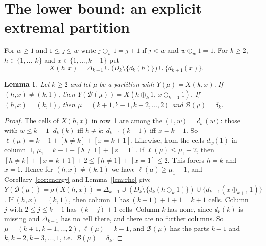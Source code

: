 \documentclass[11pt]{article}
\newtheorem{lemma}[theorem]{Lemma}
\theoremstyle{definition}
\newcommand{\B}{\mathcal{B}}
\renewcommand{\le}{\leqslant}
\renewcommand{\ge}{\geqslant}
\begin{document}
\section{The lower bound: an explicit extremal partition}\label{sec:c2lower}

For $w\ge1$ and $1\le j\le w$ write $j\oplus_w1=j+1$ if $j<w$ and $w\oplus_w1=1$.  For $k\ge2$, $h\in\{1,\dots,k\}$ and
$x\in\{1,\dots,k+1\}$ put
\[X(h,x)=\Delta_{k-1}\cup\bigl(D_k\setminus\{d_k(h)\}\bigr)\cup\{d_{k+1}(x)\}.\]

\begin{lemma}\label{lem:c2conf}
Let $k\ge2$ and let $\mu$ be a partition with $Y(\mu)=X(h,x)$.
If $(h,x)\ne(k,1)$, then $Y(\B(\mu))=X(h\oplus_k1,\,x\oplus_{k+1}1)$.
If $(h,x)=(k,1)$, then $\mu=(k+1,k-1,k-2,\dots,2)$ and $\B(\mu)=\delta_k$.
\end{lemma}
\begin{proof}
The cells of $X(h,x)$ in row~1 are among the $(1,w)=d_w(w)$: those with $w\le k-1$; $d_k(k)$ iff $h\ne k$;
$d_{k+1}(k+1)$ iff $x=k+1$.  So $\ell(\mu)=k-1+[h\ne k]+[x=k+1]$.  Likewise, from the cells $d_w(1)$ in column~1,
$\mu_1=k-1+[h\ne1]+[x=1]$.  If $\ell(\mu)\le\mu_1-2$, then $[h\ne k]+[x=k+1]+2\le[h\ne1]+[x=1]\le2$.  This forces
$h=k$ and $x=1$.  Hence for $(h,x)\ne(k,1)$ we have $\ell(\mu)\ge\mu_1-1$, and Corollary~\ref{cor:energy} and
Lemma~\ref{lem:rho} give
$Y(\B(\mu))=\rho(X(h,x))=\Delta_{k-1}\cup(D_k\setminus\{d_k(h\oplus_k1)\})\cup\{d_{k+1}(x\oplus_{k+1}1)\}$.
If $(h,x)=(k,1)$, then column~1 has $(k-1)+1+1=k+1$ cells.  Column $j$ with $2\le j\le k-1$ has $(k-j)+1$ cells.
Column $k$ has none, since $d_k(k)$ is missing and $\Delta_{k-1}$ has no cell there, and there are no further
columns.  So $\mu=(k+1,k-1,\dots,2)$, $\ell(\mu)=k-1$, and $\B(\mu)$ has the parts $k-1$ and
$k,k-2,k-3,\dots,1$, i.e.\ $\B(\mu)=\delta_k$.
\end{proof}
\end{document}
